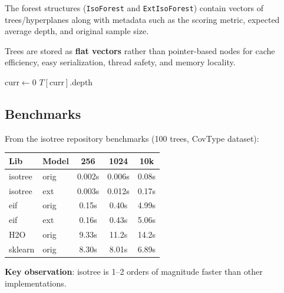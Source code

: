 The forest structures (\texttt{IsoForest} and \texttt{ExtIsoForest}) contain vectors of trees/hyperplanes along with metadata such as the scoring metric, expected average depth, and original sample size.

Trees are stored as \textbf{flat vectors} rather than pointer-based nodes for cache efficiency, easy serialization, thread safety, and memory locality.

\begin{algorithm}[t]
\caption{Tree Traversal}
\label{alg:traversal}
\DontPrintSemicolon
{}
\medskip
$\text{curr} \gets 0$ 
\Return $T[\text{curr}].\text{depth}$
\end{algorithm}

\subsection{Benchmarks}

From the isotree repository benchmarks (100 trees, CovType dataset):

\begin{table}[ht]
\begin{center}
\begin{tabular}{l l c c c}
Lib & Model & 256 & 1024 & 10k \\
\hline
isotree & orig & 0.002s & 0.006s & 0.08s \\
isotree & ext & 0.003s & 0.012s & 0.17s \\
eif & orig & 0.15s & 0.40s & 4.99s \\
eif & ext & 0.16s & 0.43s & 5.06s \\
H2O & orig & 9.33s & 11.2s & 14.2s \\
sklearn & orig & 8.30s & 8.01s & 6.89s \\
\end{tabular}
\end{center}
\label{tab:training-time}
\end{table}

\textbf{Key observation}: isotree is 1--2 orders of magnitude faster than other implementations.

